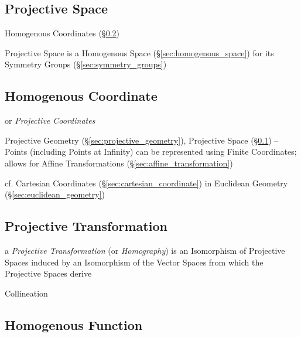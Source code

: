 \subsection{Projective Space}\label{sec:projective_space}

Homogenous Coordinates (\S\ref{sec:homogenous_coordinate})

Projective Space is a Homogenous Space (\S\ref{sec:homogenous_space}) for its
Symmetry Groups (\S\ref{sec:symmetry_groups})



\subsection{Homogenous Coordinate}\label{sec:homogenous_coordinate}

or \emph{Projective Coordinates}

Projective Geometry (\S\ref{sec:projective_geometry}), Projective
Space (\S\ref{sec:projective_space}) -- Points (including Points at
Infinity) can be represented using Finite Coordinates; allows for
Affine Transformations (\S\ref{sec:affine_transformation})

cf. Cartesian Coordinates (\S\ref{sec:cartesian_coordinate}) in
Euclidean Geometry (\S\ref{sec:euclidean_geometry})



\subsection{Projective Transformation}
\label{sec:projective_transformation}

a \emph{Projective Transformation} (or \emph{Homography}) is an
Isomorphism of Projective Spaces induced by an Isomorphism of the
Vector Spaces from which the Projective Spaces derive

Collineation



\subsection{Homogenous Function}\label{sec:homogenous_function}

